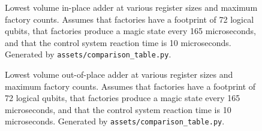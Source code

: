 \documentclass[onecolumn,unpublished]{quantumarticle}
\theoremstyle{definition}
\theoremstyle{definition}
\theoremstyle{definition}
\begin{document}
\begin{figure}
    \centering
    \caption{
        Lowest volume in-place adder at various register sizes and maximum factory counts.
        Assumes that factories have a footprint of 72 logical qubits, that factories produce a magic state every 165 microseconds, and that the control system reaction time is 10 microseconds.
        Generated by \texttt{assets/comparison\_table.py}.
    }
    \label{fig:minif}
\end{figure}

\begin{figure}
    \centering
    \caption{
        Lowest volume out-of-place adder at various register sizes and maximum factory counts.
        Assumes that factories have a footprint of 72 logical qubits, that factories produce a magic state every 165 microseconds, and that the control system reaction time is 10 microseconds.
        Generated by \texttt{assets/comparison\_table.py}.
    }
    \label{fig:minof}
\end{figure}
\end{document}
